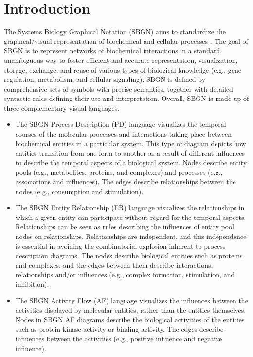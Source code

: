 \section{Introduction}
\label{introduction}
The Systems Biology Graphical Notation (SBGN) aims to standardize the graphical/visual representation of biochemical and cellular processes \citep{sbgn:2009, Junker2012, Czauderna2017, Toure2018}. The goal of SBGN is to represent networks of biochemical interactions in a standard, unambiguous way to foster efficient and accurate representation, visualization, storage, exchange, and reuse of various types of biological knowledge (e.g., gene regulation, metabolism, and cellular signaling). SBGN is defined by comprehensive sets of symbols with precise semantics, together with detailed syntactic rules defining their use and interpretation. Overall, SBGN is made up of  three complementary visual languages. 

\begin{itemize}
  \item The SBGN Process Description (PD) language \citep{Rougny2019} visualizes the temporal courses of the molecular processes and interactions taking place between biochemical entities in a particular system. This type of diagram depicts how entities transition from one form to another as a result of different influences to describe the temporal aspects of a biological system. Nodes describe entity pools (e.g., metabolites, proteins, and complexes) and processes (e.g., associations and influences). The edges describe relationships between the nodes (e.g., consumption and stimulation).
  \item The SBGN Entity Relationship (ER) language \citep{Sorokin2015} visualizes the relationships in which a given entity can participate without regard for the temporal aspects. Relationships can be seen as rules describing the influences of entity pool nodes on relationships. Relationships are independent, and this independence is essential in avoiding the combinatorial explosion inherent to process description diagrams. The nodes describe biological entities such as proteins and complexes, and the edges between them describe interactions, relationships and/or influences (e.g., complex formation, stimulation, and inhibition). 
  \item The SBGN Activity Flow (AF) language \citep{Mi2015} visualizes the influences between the activities displayed by molecular entities, rather than the entities themselves. Nodes in SBGN AF diagrams describe the biological activities of the entities such as protein kinase activity or binding activity. The edges describe influences between the activities (e.g., positive influence and negative influence).
\end{itemize}
  
